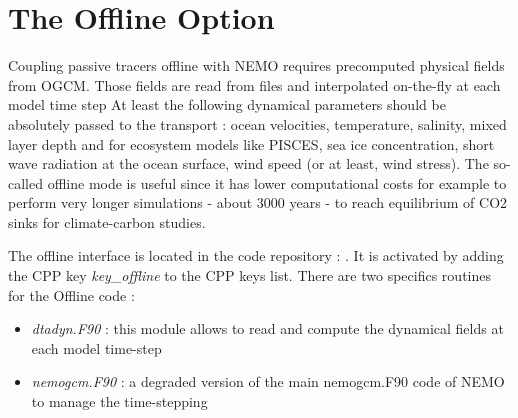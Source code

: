 \documentclass[../main/TOP_manual]{subfiles}
\begin{document}
\section{The Offline Option}
\label{Offline}


Coupling passive tracers offline with NEMO requires precomputed  physical fields from OGCM. Those fields are read from files and interpolated on-the-fly at each model time step
At least the following dynamical parameters should be absolutely passed to the transport : ocean velocities, temperature, salinity, mixed layer depth and for ecosystem models like PISCES, sea ice concentration, short wave radiation at the ocean surface, wind speed (or at least, wind stress).
The so-called offline mode is useful since it has lower computational costs for example to perform very longer simulations - about 3000 years - to reach equilibrium of CO2 sinks for climate-carbon studies.

The offline interface is located in the code repository : . It is activated by adding the CPP key  \textit{key\_offline} to the CPP keys list. There are two specifics routines for the Offline code :

\begin{itemize}
   \item \textit{dtadyn.F90} :  this module allows to read and compute the dynamical fields at each model time-step
   \item \textit{nemogcm.F90} :  a degraded version of the main nemogcm.F90 code of NEMO to manage the time-stepping
\end{itemize}


\end{document}

